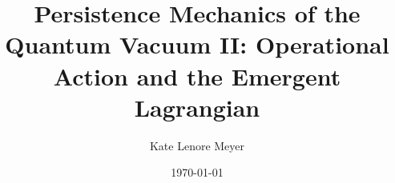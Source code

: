 \documentclass[aps,prd,twocolumn,showpacs,superscriptaddress,groupedaddress,nofootinbib,english]{revtex4-2}
\begin{document}
\title{Persistence Mechanics of the Quantum Vacuum II: Operational Action and the Emergent Lagrangian}

\author{Kate Lenore Meyer}

\date{\today}



\maketitle %

















\appendix


\end{document}
